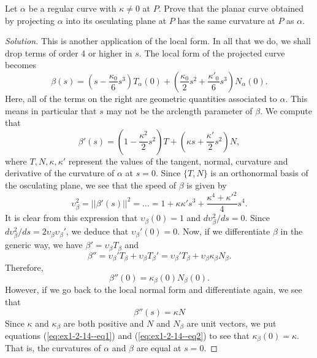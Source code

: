\documentclass[Shifrin_Solutions_Spring_2018]{subfiles}
\begin{document}
\vspace{.5in}

\begin{exercise}
Let $\alpha$ be a regular curve with $\kappa \neq 0$ at $P$. Prove that the planar 
curve obtained by projecting $\alpha$ into its osculating plane at $P$ has the same 
curvature at $P$ as $\alpha$.
\end{exercise}

\begin{proof}[Solution]
This is another application of the local form. In all that we do, we shall drop terms 
of order 4 or higher in $s$. The local form of the projected curve becomes
\[
\beta(s) = \left(s - \dfrac{\kappa_0}{6} s^3 \right) T_{\alpha}(0) 
+ \left( \dfrac{\kappa_0}{2}s^2 + \dfrac{\kappa'_0}{6}s^3 \right) N_{\alpha}(0) .
\]
Here, all of the terms on the right are geometric quantities associated to $\alpha$. 
This means in particular that $s$ may not be the arclength parameter of $\beta$.
We compute that
\[
\beta'(s) = \left( 1 - \dfrac{\kappa^2}{2}s^2\right) T + \left( \kappa s 
+ \dfrac{\kappa'}{2}s^2\right) N,
\]
where $T, N, \kappa, \kappa'$ represent the values of the tangent, normal, curvature 
and derivative of the curvature of $\alpha$ at $s=0$. Since $\{T, N\}$ is an 
orthonormal basis of the osculating plane, we see that the speed of $\beta$ is given by
\[
\upsilon_{\beta}^2 = ||\beta'(s)||^2 = \dots = 1 + \kappa\kappa' s^3 + \dfrac{\kappa^4 
+ {\kappa'}^2}{4}s^4 .
\]
It is clear from this expression that $\upsilon_{\beta}(0) = 1$ and 
$d\upsilon_{\beta}^2/ds = 0$. Since 
$d\upsilon_{\beta}^2/ds = 2\upsilon_{\beta} \upsilon_{\beta}'$, we deduce that 
$\upsilon_{\beta}'(0) = 0.$
Now, if we differentiate $\beta$ in the generic way, we have $\beta' = 
\upsilon_{\beta} T_{\beta}$ and
\[
\beta'' = \upsilon_{\beta}' T_{\beta} + \upsilon_{\beta}T_{\beta}' = 
\upsilon_{\beta}' T_{\beta} + \upsilon_{\beta}\kappa_{\beta}N_{\beta} .
\]
Therefore,
\begin{equation}\label{eq:ex1-2-14--eq1}
\beta''(0) =  \kappa_{\beta}(0) N_{\beta}(0).
\end{equation}
However, if we go back to the local normal form and differentiate again, we see that
\begin{equation}\label{eq:ex1-2-14--eq2}
\beta''(s) = \kappa N
\end{equation}
Since $\kappa$ and $\kappa_{\beta}$ are both positive and $N$ and $N_{\beta}$ are 
unit vectors, we put equations (\ref{eq:ex1-2-14--eq1}) and (\ref{eq:ex1-2-14--eq2}) 
to see that $\kappa_{\beta}(0) = \kappa$. That is, the curvatures of $\alpha$ and 
$\beta$ are equal at $s=0$.
\end{proof}
\end{document}
